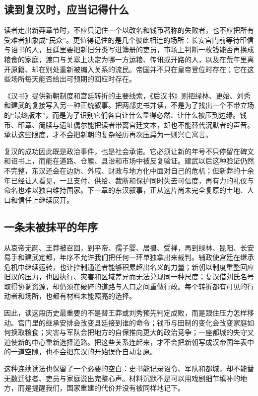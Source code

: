 \subsection{读到复汉时，应当记得什么}

读者走出新莽章节时，不应只记住一个以改名和钱币著称的失败者，也不应把所有受难者抽象成“民众”。更值得记住的是几个彼此相连的场所：长安宫门前等待印信与诏书的人，县廷里要把新旧分类写进簿册的吏员，市场上判断一枚钱能否再换成粮食的家庭，渡口与关塞上决定为哪一方运粮、传讯或开路的人，以及在荒年里离开原籍、却在别处重新被编入关系的流民。帝国并不只在皇帝登位时存在；它在这些场所每天能否给出可预期的回应时存在。

《汉书》提供新朝制度和宫廷转折的主要线索，《后汉书》则把绿林、更始、刘秀和建武的复接写入另一种正统叙事。把两部史书并读，不是为了找出一个不带立场的“最终版本”，而是为了识别它们各自让什么显得必然、让什么被压到边缘。钱币、印章、简牍与遗址偶尔能把读者带离宫廷文本，却也不能替代沉默者的声音。承认这些限度，才不会把新朝的复杂经历再次压扁为一则兴亡寓言。

复汉的成功因此既是政治事件，也是社会承诺。它必须让新的年号不只停留在碑文和诏书上，而能在道路、仓廪、县治和市场中被反复验证。建武以后这种验证仍然不完整，东汉还会在边防、外戚、财政与地方化中面对自己的危机；但新莽的十余年已经让人看见，一旦支付、供给、裁断和保护同时失去可信度，再有力的礼仪与命名也难以独自维持国家。下一章的东汉叙事，正从这片尚未完全复原的土地、人口和信任上继续展开。

\subsection{一条未被抹平的年序}

从哀帝无嗣、王莽被召回，到平帝、孺子婴、居摄、受禅，再到绿林、昆阳、长安易手和建武定都，年序不允许我们把任何一环单独拿出来裁判。辅政使宫廷在继承危机中继续运转，也让控制通道者能够积累超出名义的力量；新朝以制度重整回应旧汉的压力，也因执行、灾害和区域差异而无法兑现同一种尺度；复汉借刘氏名号取得协调资源，却仍须在破碎的道路与人口之间重做行政。每个转折都有可见的行动者和场所，也都有材料未能照亮的选择。

因此，读这段历史最重要的不是替王莽或刘秀预先判定成败，而是跟住压力怎样移动。宫门里的继承安排会改变县廷接到谁的命令；钱币与田制的变化会改变家庭如何换取粮食；灾害与军队会把地方的自保推向更大的政治竞争；一座都城的失守又迫使新的中心重新选择道路。把这些关系连起来，才不会把新朝写成汉帝国年表中的一道空隙，也不会把东汉的开始误作自动复原。

这种连续读法也保留了一个必要的空白：史书能记录诏令、军队和都城，却不能替无数迁徙者、吏员与家庭说出完整心声。材料沉默不是可以用戏剧细节填补的地方，而是提醒我们，国家重建的代价并没有被同样地记下。

